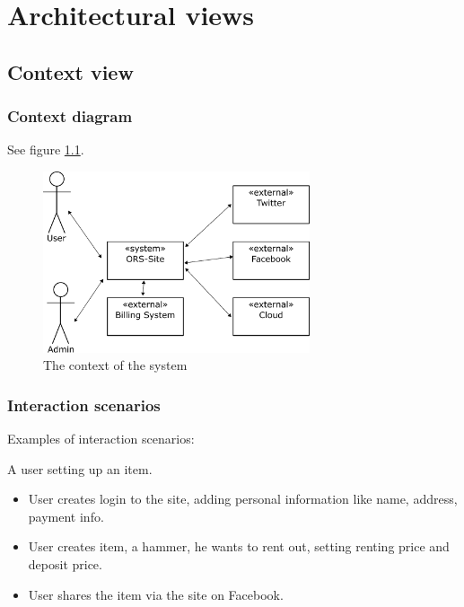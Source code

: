 \documentclass[a4paper,11pt]{report}
\begin{document}
\chapter{Architectural views}
\label{cha:architectural-views}
\thispagestyle{fancy}

\section{Context view}
\label{sec:context-view}



\subsection{Context diagram}
\label{sec:context-diagram}

See figure \ref{fig:context}.

\begin{figure}[h!]
  \centering
  \includegraphics[width=0.7\textwidth]{figures/context_drawing}
  \caption{The context of the system}
  \label{fig:context}
\end{figure}

\subsection{Interaction scenarios}
\label{sec:inter-scen}
Examples of interaction scenarios:

A user setting up an item.
\begin{itemize}
  \item User creates login to the site, adding personal information like name, address, payment info.
  \item User creates item, a hammer, he wants to rent out, setting renting price and deposit price.
  \item User shares the item via the site on Facebook.
\end{itemize}
\end{document}

